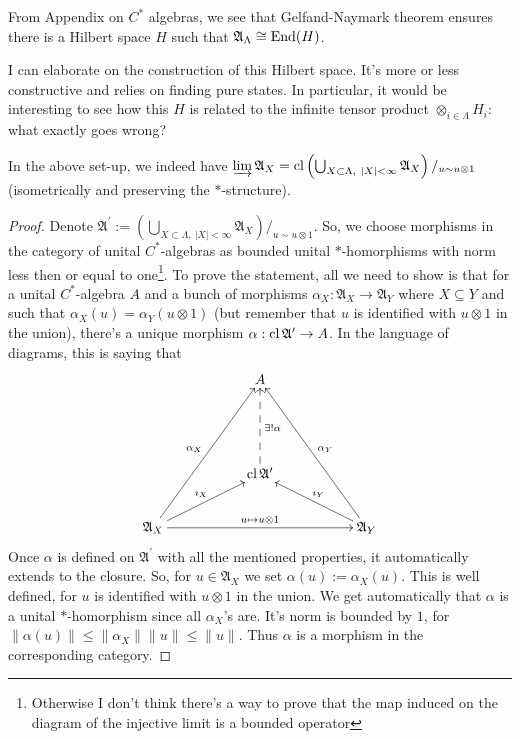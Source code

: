 From Appendix on $C^*$ algebras, we see that Gelfand-Naymark theorem ensures there is a Hilbert space $H$ such that $\mathfrak A_{\Lambda} \cong \operatorname{End}(H)$.
\begin{fur}
I can elaborate on the construction of this Hilbert space. It's more or less constructive and relies on finding pure states. In particular, it would be interesting to see how this $H$ is related to the infinite tensor product $\otimes_{i \in \Lambda} H_i$: what exactly goes wrong?
\end{fur}
\begin{proposition}
In the above set-up, we indeed have $\varinjlim \mathfrak A_{X} = \operatorname{cl} \left(\bigcup_{X \subset \Lambda, \ |X| < \infty} \mathfrak A_{X}\right)/_{u \sim u \otimes 1}$ (isometrically and preserving the $\ast$-structure).
\end{proposition}
\begin{proof}
Denote $\mathfrak A^\prime := \left(\bigcup_{X \subset \Lambda, \ |X|<\infty} \mathfrak A_X\right)/_{u \sim u \otimes 1}$.
So, we choose morphisms in the category of unital $C^*$-algebras as bounded unital $\ast$-homorphisms with norm less then or equal to one\footnote{Otherwise I don't think there's a way to prove that the map induced on the diagram of the injective limit is a bounded operator}. To prove the statement, all we need to show is that for a unital $C^*$-algebra $A$ and a bunch of morphisms $\alpha_X : \mathfrak A_X \rightarrow \mathfrak A_Y$ where $X \subseteq Y$ and such that $\alpha_X(u) = \alpha_Y(u \otimes 1)$ (but remember that $u$ is identified with $u \otimes 1$ in the union), there's a unique morphism $\alpha : \operatorname{cl} \mathfrak A^\prime \rightarrow A$. In the language of diagrams, this is saying that
\[
\xymatrix{
& & A & & \\
& &  & & \\
& & \cl \mathfrak A^\prime\ar@{-->}[uu]_{\exists ! \alpha} & &\\
\mathfrak A_X\ar[rrrr]^{u \mapsto u \otimes 1} \ar[rru]^{\imath_X} \ar[rruuu]^{\alpha_X} & & & & \mathfrak A_Y\ar[lluuu]_{\alpha_Y} \ar[llu]_{\imath_Y}
}
\]
Once $\alpha$ is defined on $\mathfrak A^\prime$ with all the mentioned properties, it automatically extends to the closure. So, for $u \in \mathfrak A_X$ we set $\alpha(u) := \alpha_X(u)$. This is well defined, for $u$ is identified with $u \otimes 1$ in the union. We get automatically that $\alpha$ is a unital $\ast$-homorphism since all $\alpha_X$'s are. It's norm is bounded by $1$, for $\|\alpha(u)\| \leq \|\alpha_X\|\|u\| \leq \|u\|$. Thus $\alpha$ is a morphism in the corresponding category.
\end{proof}

